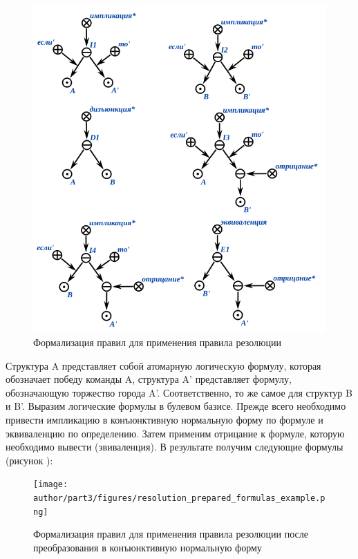 \begin{figure}[H]
	\includegraphics[scale=0.8]{author/part3/figures/resolution_formulas_example.png}
	\caption{Формализация правил для применения правила резолюции}
	\label{fig:resolution_formulas_example}
\end{figure}

Структура A представляет собой атомарную логическую формулу, которая обозначает победу команды A, структура A' представляет формулу, обозначающую торжество города A'. Соответственно, то же самое для структур B и B'.
Выразим логические формулы в булевом базисе. Прежде всего необходимо привести импликацию в конъюнктивную нормальную форму по формуле  и эквиваленцию по определению. Затем применим отрицание к формуле, которую необходимо вывести (эвиваленция). В результате получим следующие формулы (рисунок ):

\begin{figure}[H]
	\texttt{[image: author/part3/figures/resolution\_prepared\_formulas\_example.png]}
	\caption{Формализация правил для применения правила резолюции после преобразования в конъюнктивную нормальную форму}
	\label{fig:resolution_prepared_formulas}
\end{figure}

